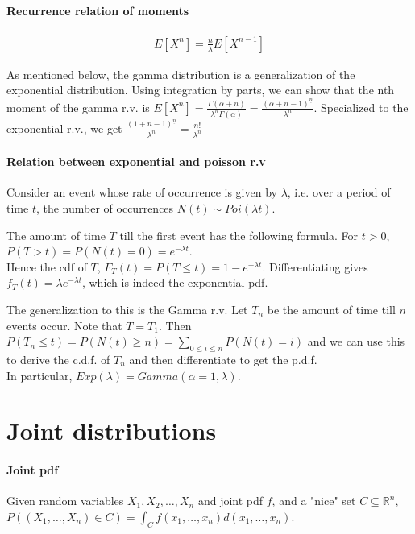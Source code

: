 \documentclass{article}
\begin{document}
\paragraph{Recurrence relation of moments}
\begin{align*}
	E[X^n] = \frac{n}{\lambda}E[X^{n-1}]
\end{align*}

As mentioned below, the gamma distribution is a generalization of the exponential distribution. Using integration by parts, we can show that the nth moment of the gamma r.v. is $E[X^n] = \frac{\Gamma(\alpha + n)}{\lambda^n \Gamma(\alpha)} = \frac{(\alpha + n - 1)^{\underline{n}}}{\lambda^n}$. Specialized to the exponential r.v., we get $\frac{(1+n-1)^{\underline{n}}}{\lambda^n} = \frac{n!}{\lambda^n}$

\paragraph{Relation between exponential and poisson r.v}
Consider an event whose rate of occurrence is given by $\lambda$, i.e. over a period of time $t$, the number of occurrences $N(t)\sim Poi(\lambda t)$.

The amount of time $T$ till the first event has the following formula. For $t > 0$, $P(T > t) = P(N(t) = 0) = e^{-\lambda t}$.\\
Hence the cdf of $T$, $F_T(t) = P(T\leq t) = 1-e^{-\lambda t}$. Differentiating gives $f_T(t) = \lambda e^{-\lambda t}$, which is indeed the exponential pdf.

The generalization to this is the Gamma r.v. Let $T_n$ be the amount of time till $n$ events occur. Note that $T = T_1$. Then $P(T_n\leq t) = P(N(t)\geq n) = \sum_{0\leq i\leq n}P(N(t) = i)$ and we can use this to derive the c.d.f. of $T_n$ and then differentiate to get the p.d.f.\\
In particular, $Exp(\lambda) = Gamma(\alpha = 1, \lambda)$.


\section{Joint distributions}
\paragraph{Joint pdf} Given random variables $X_1,X_2,\dots, X_n$ and joint pdf $f$, and a "nice" set $C\subseteq \mathbb{R}^n$, $P((X_1,\dots,X_n) \in C) = \int_C f(x_1,\dots, x_n) d(x_1,\dots,x_n)$.
\end{document}
